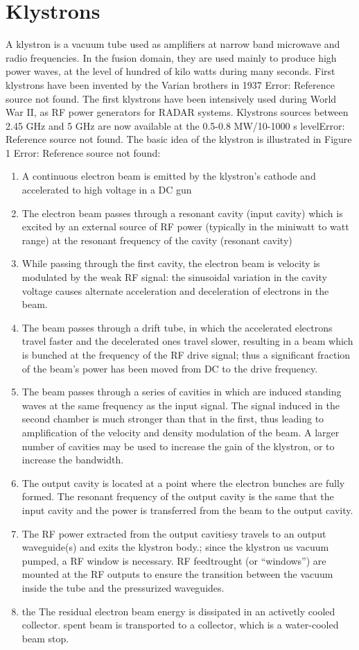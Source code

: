 \section{Klystrons}
A klystron is a vacuum tube used as amplifiers at narrow band microwave and radio frequencies. In the fusion domain, they are used mainly to produce high power waves, at the level of hundred of kilo watts during many seconds. First klystrons have been invented by the Varian brothers in 1937 Error: Reference source not found. The first klystrons have been intensively used during World War II, as RF power generators for RADAR systems. Klystrons sources between 2.45 GHz and 5 GHz are now available at the 0.5-0.8 MW/10-1000 s levelError: Reference source not found. 
The basic idea of the klystron is illustrated in Figure 1 Error: Reference source not found:

\begin{enumerate}
 \item  A continuous electron beam is emitted by the klystron's cathode and accelerated to high voltage in a DC gun 
 \item The electron beam passes through a resonant cavity (input cavity) which is excited by an external source of RF power (typically in the miniwatt to watt range) at the resonant frequency of the cavity (resonant cavity) 
\item While passing through the first cavity, the electron beam is velocity is modulated by the weak RF signal: the sinusoidal variation in the cavity voltage causes alternate acceleration and deceleration of electrons in the beam. 
\item The beam passes through a drift tube, in which the accelerated electrons travel faster and the decelerated ones travel slower, resulting in a beam which is bunched at the frequency of the RF drive signal; thus a significant fraction of the beam’s power has been moved from DC to the drive frequency. 
\item The beam passes through a series of cavities in which are induced standing waves at the same frequency as the input signal. The signal induced in the second chamber is much stronger than that in the first, thus leading to amplification of the velocity and density modulation of the beam. A larger number of cavities may be used to increase the gain of the klystron, or to increase the bandwidth. 
\item The output cavity is located at a point where the electron bunches are fully formed. The resonant frequency of the output cavity is the same that the input cavity and the power is transferred from the beam to the output cavity. 
\item The RF power extracted from the output cavitiesy travels to an output waveguide(s) and exits the klystron body.;  since the klystron us vacuum pumped, a RF window is necessary. RF feedtrought (or “windows”) are mounted at the RF outputs to ensure the transition between the vacuum inside the tube and the pressurized waveguides.
\item the The residual electron beam energy is dissipated in an activetly cooled collector. spent beam is transported to a collector, which is a water-cooled beam stop. 
\end{enumerate}

